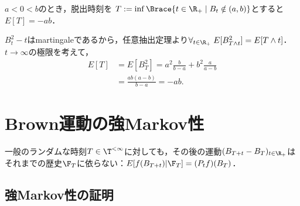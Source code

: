 \documentclass[uplatex,dvipdfmx]{jsreport}
\begin{document}
\begin{proposition}[脱出時刻の期待値]\label{prop-mean-of-Brownian-exit-time}
    $a<0<b$のとき，脱出時刻を
    $T:=\inf\Brace{t\in\R_+\mid B_t\notin(a,b)}$とすると$E[T]=-ab$．
\end{proposition}
\begin{Proof}
    $B_t^2-t$はmartingaleであるから，任意抽出定理より$\forall_{t\in\R_+}\;E[B^2_{T\land t}]=E[T\land t]$．
    $t\to\infty$の極限を考えて，
    \begin{align*}
        E[T]&=E[B_T^2]=a^2\frac{b}{b-a}+b^2\frac{a}{a-b}\\
        &=\frac{ab(a-b)}{b-a}=-ab.
    \end{align*}
\end{Proof}

\section{Brown運動の強Markov性}

\begin{tcolorbox}[colframe=ForestGreen, colback=ForestGreen!10!white,breakable,colbacktitle=ForestGreen!40!white,coltitle=black,fonttitle=\bfseries\sffamily,
title=]
    一般のランダムな時刻$T\in\T^{<\infty}$に対しても，その後の運動$(B_{T+t}-B_T)_{t\in\R_+}$はそれまでの歴史$\F_T$に依らない：$E[f(B_{T+t})|\F_T]=(P_tf)(B_T)$．
\end{tcolorbox}

\subsection{強Markov性の証明}
\end{document}
